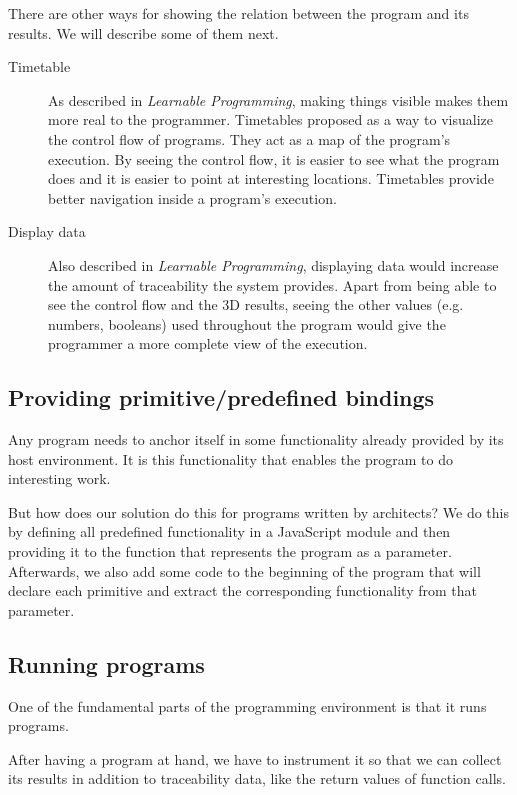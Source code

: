 There are other ways for showing the relation between the program and its results.
We will describe some of them next.
\begin{description}
  \item[Timetable] As described in {\it Learnable Programming}\cite{victor2012learnable}, making things visible makes them more real to the programmer. Timetables proposed as a way to visualize the control flow of programs. They act as a map of the program's execution. By seeing the control flow, it is easier to see what the program does and it is easier to point at interesting locations. Timetables provide better navigation inside a program's execution.
  \item[Display data] Also described in {\it Learnable Programming}\cite{victor2012learnable}, displaying data would increase the amount of traceability the system provides. Apart from being able to see the control flow and the 3D results, seeing the other values (e.g. numbers, booleans) used throughout the program would give the programmer a more complete view of the execution.
\end{description}

\subsection{Providing primitive/predefined bindings}
\label{sub:provide:predefs}
Any program needs to anchor itself in some functionality already provided by its host environment.
It is this functionality that enables the program to do interesting work.

But how does our solution do this for programs written by architects?
We do this by defining all predefined functionality in a JavaScript module and then providing it to the function that represents the program as a parameter.
Afterwards, we also add some code to the beginning of the program that will declare each primitive and extract the corresponding functionality from that parameter.

\subsection{Running programs}
One of the fundamental parts of the programming environment is that it runs programs.

After having a program at hand, we have to instrument it so that we can collect its results in addition to traceability data, like the return values of function calls.

